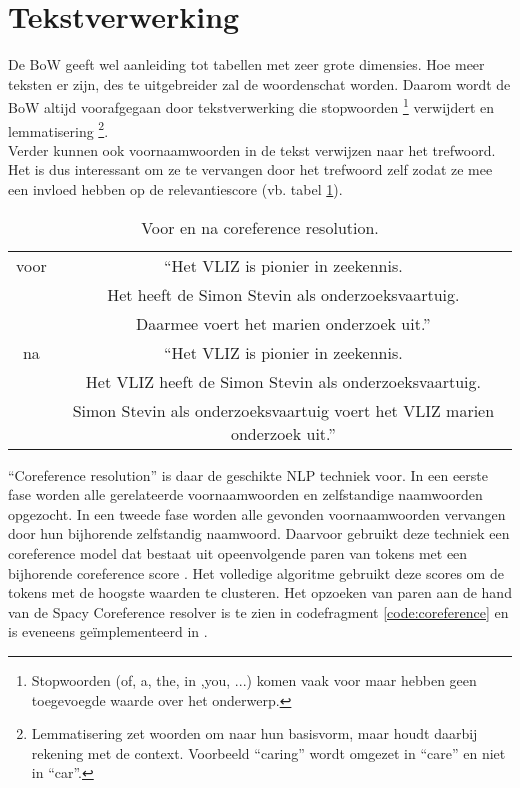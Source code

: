 \section{Tekstverwerking}
De BoW geeft wel aanleiding tot tabellen met zeer grote dimensies. Hoe meer teksten er zijn, des te uitgebreider zal de woordenschat worden. Daarom wordt de BoW altijd voorafgegaan door tekstverwerking die stopwoorden \footnote{Stopwoorden (of, a, the, in ,you, ...) komen vaak voor maar hebben geen toegevoegde waarde over het onderwerp.} verwijdert en lemmatisering \footnote{Lemmatisering zet woorden om naar hun basisvorm, maar houdt daarbij rekening met de context. Voorbeeld ``caring'' wordt omgezet in ``care'' en niet in ``car''.}.\\
Verder kunnen ook voornaamwoorden in de tekst verwijzen naar het trefwoord. Het is dus interessant om ze te vervangen door het trefwoord zelf zodat ze mee een invloed hebben op de relevantiescore (vb. tabel \ref{table:nlp}).
\begin{table}[h!]
    \centering
    \begin{tabular}{|c|c|} 
        \hline
        voor&``Het VLIZ is pionier in zeekennis.\\&Het heeft de Simon Stevin als onderzoeksvaartuig.\\&Daarmee voert het marien onderzoek uit.''\\
        \hline
        na&``Het VLIZ is pionier in zeekennis.\\&Het VLIZ heeft de Simon Stevin als onderzoeksvaartuig.\\&Simon Stevin als onderzoeksvaartuig voert het VLIZ marien onderzoek uit.''\\
        \hline
    \end{tabular}
    \caption{Voor en na coreference resolution.}
    \label{table:nlp}
\end{table}
``Coreference resolution'' is daar de geschikte NLP techniek voor. In een eerste fase worden alle gerelateerde voornaamwoorden en zelfstandige naamwoorden opgezocht. In een tweede fase worden alle gevonden voornaamwoorden vervangen door hun bijhorende zelfstandig naamwoord. Daarvoor gebruikt deze techniek een coreference model dat bestaat uit opeenvolgende paren van tokens met een bijhorende coreference score \autocite{Lee2017}. Het volledige algoritme \autocite{Explosion2025} gebruikt deze scores om de tokens met de hoogste waarden te clusteren.
Het opzoeken van paren aan de hand van de Spacy Coreference resolver \autocite{Spacy2025} is te zien in codefragment \ref{code:coreference} en is eveneens geïmplementeerd in \textcite{Depaepenlp2025}.
